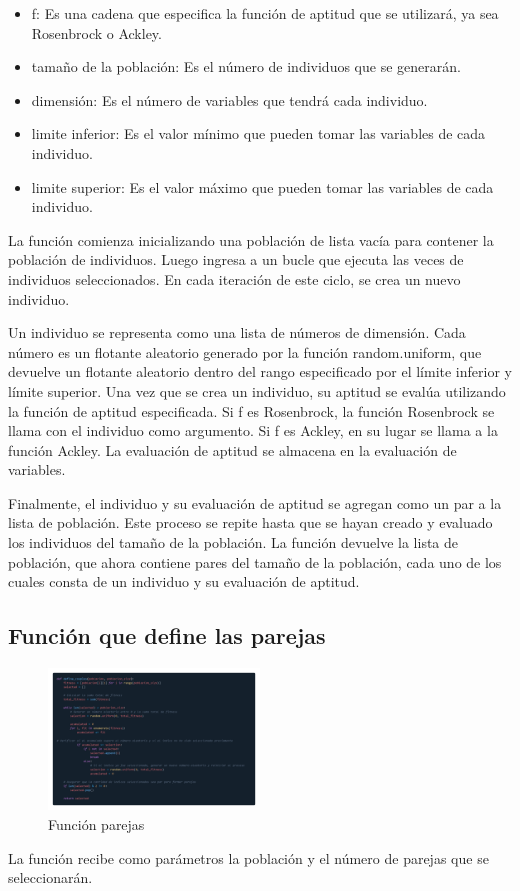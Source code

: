 \documentclass{report}
\begin{document}
    \begin{itemize}
        \item f: Es una cadena que especifica la función de aptitud que se utilizará, ya sea Rosenbrock o Ackley.
        \item tamaño de la población: Es el número de individuos que se generarán.
        \item dimensión: Es el número de variables que tendrá cada individuo.
        \item limite inferior: Es el valor mínimo que pueden tomar las variables de cada individuo.
        \item limite superior: Es el valor máximo que pueden tomar las variables de cada individuo.
    \end{itemize}
    
    La función comienza inicializando una población de lista vacía para contener la población de individuos. Luego ingresa a un bucle que ejecuta las veces de individuos seleccionados. En cada iteración de este ciclo, se crea un nuevo individuo.

    Un individuo se representa como una lista de números de dimensión. Cada número es un flotante aleatorio generado por la función random.uniform, que devuelve un flotante aleatorio dentro del rango especificado por el límite inferior y límite superior.
    Una vez que se crea un individuo, su aptitud se evalúa utilizando la función de aptitud especificada. Si f es Rosenbrock, la función Rosenbrock se llama con el individuo como argumento. Si f es Ackley, en su lugar se llama a la función Ackley. La evaluación de aptitud se almacena en la evaluación de variables.

    Finalmente, el individuo y su evaluación de aptitud se agregan como un par a la lista de población. Este proceso se repite hasta que se hayan creado y evaluado los individuos del tamaño de la población.
    La función devuelve la lista de población, que ahora contiene pares del tamaño de la población, cada uno de los cuales consta de un individuo y su evaluación de aptitud.

    \subsection*{Función que define las parejas}
    \begin{figure}[h]
        \centering
        \includegraphics[width=0.5\textwidth]{funcionParejas.png}
        \caption{Función parejas}
    \end{figure}
    La función recibe como parámetros la población y el número de parejas que se seleccionarán. 
\end{document}
